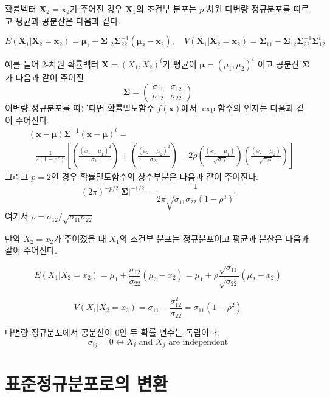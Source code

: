 \documentclass[
]{book}
\theoremstyle{definition}
\theoremstyle{definition}
\theoremstyle{definition}
\theoremstyle{definition}
\theoremstyle{remark}
\begin{document}
확률벡터 \(\bm X_2 = \bm x_2\)가 주어진 경우 \(\bm X_1\)의 조건부 분포는 \(p\)-차원 다변량 정규분포를 따르고 평균과 공분산은 다음과 같다.

\[ 
  E(\bm X_1 | \bm X_2 = \bm x_2 ) = \bm \mu_1 + \bm \Sigma_{12} \bm \Sigma^{-1}_{22} (\bm \mu_2 - \bm x_2), \quad
  V(\bm X_1 | \bm X_2 = \bm x_2 )  = \bm \Sigma_{11} -\bm \Sigma_{12} \bm \Sigma^{-1}_{22} \bm \Sigma^t_{12}
  \]

예를 들어 \(2\)-차원 확률벡터 \(\bm X=(X_1, X_2)^t\)가 평균이 \(\bm \mu=(\mu_1,\mu_2)^t\) 이고
공분산 \(\bm \Sigma\)가 다음과 같이 주어진
\begin{equation*}
\bm \Sigma =
  \begin{pmatrix}
\sigma_{11} & \sigma_{12} \\
\sigma_{12} & \sigma_{22}
\end{pmatrix}
\end{equation*}
이변량 정규분포를 따른다면 확률밀도함수 \(f(\bm x)\)에서 \(\exp\)함수의 인자는 다음과 같이 주어진다.
\begin{eqnarray*}
&(\bm x-\bm \mu) \bm \Sigma^{-1}(\bm x-\bm \mu)^t
= \\
&-\frac{1}{2 (1-\rho^2)} 
\left [ 
  \left ( \frac{(x_1-\mu_1)^2}{\sigma_{11}} \right )
  +\left ( \frac{(x_2-\mu_2)^2}{\sigma_{22}} \right )
  -2 \rho \left ( \frac{(x_1-\mu_1)}{\sqrt{\sigma_{11}}} \right )
  \left ( \frac{(x_2-\mu_2)}{\sqrt{\sigma_{22}}} \right )
  \right ]
\end{eqnarray*}
그리고 \(p=2\)인 경우 확률밀도함수의 상수부분은 다음과 같이 주어진다.
\[ (2 \pi)^{-p/2} | \bm \Sigma|^{-1/2} = \frac{1}{ 2 \pi \sqrt{\sigma_{11} \sigma_{22} (1-\rho^2)}} \]
여기서 \(\rho = \sigma_{12} / \sqrt{\sigma_{11} \sigma_{22}}\)

만약 \(X_2 = x_2\)가 주어졌을 때 \(X_1\)의 조건부 분포는 정규분포이고 평균과 분산은 다음과 같이 주어진다.

\[ 
  E( X_1 |  X_2 =  x_2 ) =  \mu_1 +  \frac{\sigma_{12}}{\sigma_{22}} ( \mu_2 -  x_2)  = \mu_1 +  \rho \frac{\sqrt{\sigma_{11}}}{\sqrt{\sigma_{22}}} ( \mu_2 -  x_2) \]

\[
  V( X_1 |  X_2 =  x_2 )  =  \sigma_{11} - \frac{\sigma^2_{12}}{\sigma_{22}}  = \sigma_{11}(1-\rho^2)
  \]

다변량 정규분포에서 공분산이 0인 두 확률 변수는 독립이다.
\[ \sigma_{ij} = 0 \leftrightarrow X_i \text{ and } X_j \text{ are independent} \]

\hypertarget{uxd45cuxc900uxc815uxaddcuxbd84uxd3ecuxb85cuxc758-uxbcc0uxd658}{%
\section{표준정규분포로의 변환}\label{uxd45cuxc900uxc815uxaddcuxbd84uxd3ecuxb85cuxc758-uxbcc0uxd658}}
\end{document}

